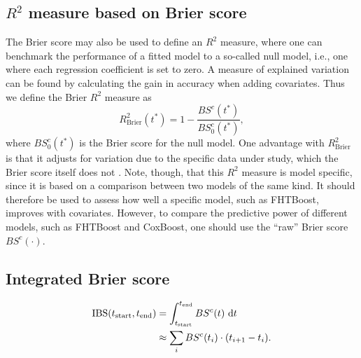 \subsection{$R^2$ measure based on Brier score}
The Brier score may also be used to define an $R^2$ measure, where one can benchmark the performance of a fitted model to a so-called null model, i.e., one where each regression coefficient is set to zero. A measure of explained variation can be found by calculating the gain in accuracy when adding covariates. Thus we define the Brier $R^2$ measure as
\begin{equation*}
    R^2_{\text{Brier}}(t^*)=1-\frac{BS^c(t^*)}{BS^c_0(t^*)},
\end{equation*}
where $BS^c_0(t^*)$ is the Brier score for the null model.
One advantage with $R^2_{\text{Brier}}$ is that it adjusts for variation due to the specific data under study, which the Brier score itself does not \citep{bovelstadborgan}.
Note, though, that this $R^2$ measure is model specific, since it is based on a comparison between two models of the same kind.
It should therefore be used to assess how well a specific model, such as FHTBoost, improves with covariates.
However, to compare the predictive power of different models, such as FHTBoost and CoxBoost, one should use the ``raw'' Brier score $BS^c(\cdot)$.

\subsection{Integrated Brier score}
\begin{align*}
    \text{IBS}(t_{\text{start}}, t_{\text{end}})&=\int_{t_{\text{start}}}^{t_{\text{end}}}BS^c(t)~\text{d} t \\
    &\approx\sum_{i}BS^c(t_i)\cdot(t_{i+1}-t_{i}).
\end{align*}
